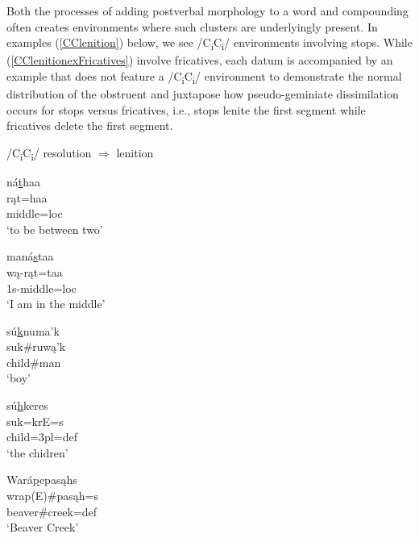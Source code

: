 Both the processes of adding postverbal morphology to a word and compounding often creates environments where such clusters are underlyingly present. In examples (\ref{CClenition}) below, we see /C\textsubscript{i}C\textsubscript{i}/ environments involving stops. While (\ref{CClenitionexFricatives}) involve fricatives, each datum is accompanied by an example that does not feature a /C\textsubscript{i}C\textsubscript{i}/ environment to demonstrate the normal distribution of the obstruent and juxtapose how pseudo-geminiate dissimilation occurs for stops versus fricatives, i.e., stops lenite the first segment while fricatives delete the first segment.

\begin{exe}
\item\label{CClenition} /C\textsubscript{i}C\textsubscript{i}/ resolution $\Rightarrow$ lenition
	\begin{xlist}

	\item\label{CClenitionex1a} \glll ná\uline{t}haa\\
		rąt=haa\\
		\textnormal{middle}=loc\\
		\glt `to be between two' \citep[170]{hollow1970}

	\item\label{CClenitionex1} \glll maná\uline{s}taa\\
	wą-rąt=taa\\
	1s-\textnormal{middle}=loc\\
	\glt `I am in the middle' \citep[37]{hollow1970}

	\item\label{CClenitionex2a} \glll sú\uline{k}numa'k\\
		suk\#ruwą'k\\
		\textnormal{child}\#\textnormal{man}\\
		\glt `boy' \cite[220]{hollow1970}

	\item\label{CClenitionex2} \glll sú\uline{h}keres\\
	suk=krE=s\\
	\textnormal{child}=3pl=def\\
	\glt `the chidren' \citep[178]{hollow1973a}

	\item\label{CClenitionex3} \glll Wará\uline{p}epasąhs\\
	wrap(E)\#pasąh=s\\
	\textnormal{beaver}\#\textnormal{creek}=def\\
	\glt `Beaver Creek' \citep[67]{hollow1973a}
 \end{xlist}
 \end{exe}

